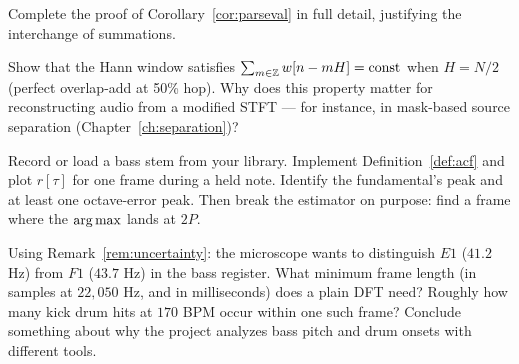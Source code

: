 \begin{exercise}
Complete the proof of Corollary~\ref{cor:parseval} in full detail, justifying
the interchange of summations.
\end{exercise}

\begin{exercise}
Show that the Hann window satisfies
$\sum_{m \in \mathbb{Z}} w[n - mH] = \text{const}$ when $H = N/2$ (perfect overlap-add
at 50\% hop). Why does this property matter for reconstructing audio from a
modified STFT --- for instance, in mask-based source separation
(Chapter~\ref{ch:separation})?
\end{exercise}

\begin{exercise}[computational]
Record or load a bass stem from your library. Implement
Definition~\ref{def:acf} and plot $r[\tau]$ for one frame during a held note.
Identify the fundamental's peak and at least one octave-error peak. Then
break the estimator on purpose: find a frame where the $\operatorname*{arg\,max}$ lands at
$2P$.
\end{exercise}

\begin{exercise}
Using Remark~\ref{rem:uncertainty}: the microscope wants to distinguish
$E1$ ($41.2$ Hz) from $F1$ ($43.7$ Hz) in the bass register. What minimum
frame length (in samples at $22{,}050$ Hz, and in milliseconds) does a plain
DFT need? Roughly how many kick drum hits at $170$ BPM occur within one such
frame? Conclude something about why the project analyzes bass pitch and drum
onsets with different tools.
\end{exercise}
